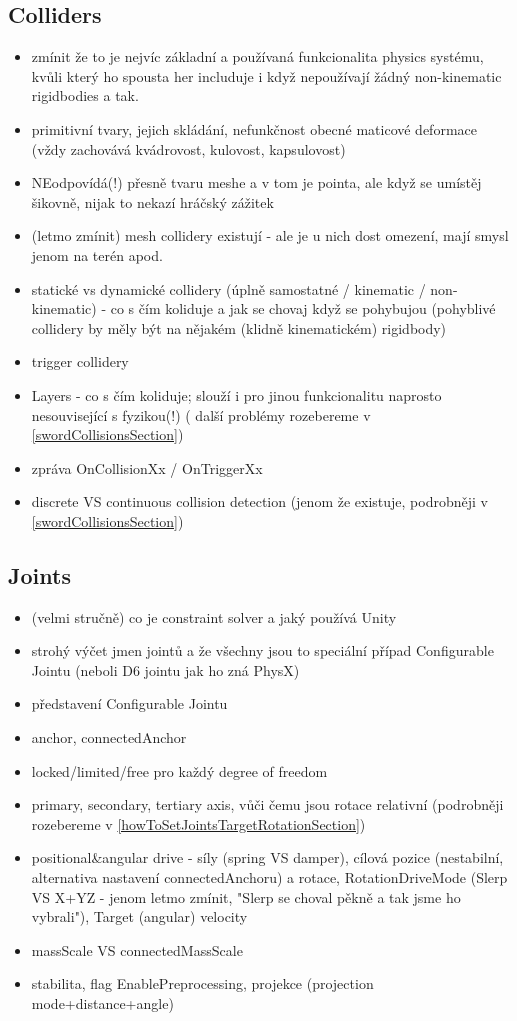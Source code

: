 \subsection{Colliders}
\begin{itemize}
    \item zmínit že to je nejvíc základní a používaná funkcionalita physics systému, kvůli který ho spousta her includuje i když nepoužívají žádný non-kinematic rigidbodies a tak.  
    \item primitivní tvary, jejich skládání, nefunkčnost obecné maticové deformace (vždy zachovává kvádrovost, kulovost, kapsulovost)
    \item NEodpovídá(!) přesně tvaru meshe a v tom je pointa, ale když se umístěj šikovně, nijak to nekazí hráčský zážitek
    \item (letmo zmínit) mesh collidery existují - ale je u nich dost omezení, mají smysl jenom na terén apod.
    \item statické vs dynamické collidery (úplně samostatné / kinematic / non-kinematic) - co s čím koliduje a jak se chovaj když se pohybujou (pohyblivé collidery by měly být na nějakém (klidně kinematickém) rigidbody)
    \item trigger collidery
    \item Layers - co s čím koliduje; slouží i pro jinou funkcionalitu naprosto nesouvisející s fyzikou(!) ( další problémy rozebereme v \ref{swordCollisionsSection})
    \item zpráva OnCollisionXx / OnTriggerXx
    \item discrete VS continuous collision detection (jenom že existuje, podrobněji v \ref{swordCollisionsSection})
\end{itemize}

\subsection{Joints}
\begin{itemize}
    \item (velmi stručně) co je constraint solver a jaký používá Unity
    \item strohý výčet jmen jointů a že všechny jsou to speciální případ Configurable Jointu (neboli D6 jointu jak ho zná PhysX)
    \item představení Configurable Jointu
    \item anchor, connectedAnchor
    \item locked/limited/free pro každý degree of freedom
    \item primary, secondary, tertiary axis, vůči čemu jsou rotace relativní (podrobněji rozebereme v \ref{howToSetJointsTargetRotationSection})
    \item positional\&angular drive - síly (spring VS damper), cílová pozice (nestabilní, alternativa nastavení connectedAnchoru) a rotace, RotationDriveMode (Slerp VS X+YZ - jenom letmo zmínit, "Slerp se choval pěkně a tak jsme ho vybrali"), Target (angular) velocity
    \item massScale VS connectedMassScale
    \item stabilita, flag EnablePreprocessing, projekce (projection mode+distance+angle)
\end{itemize}


